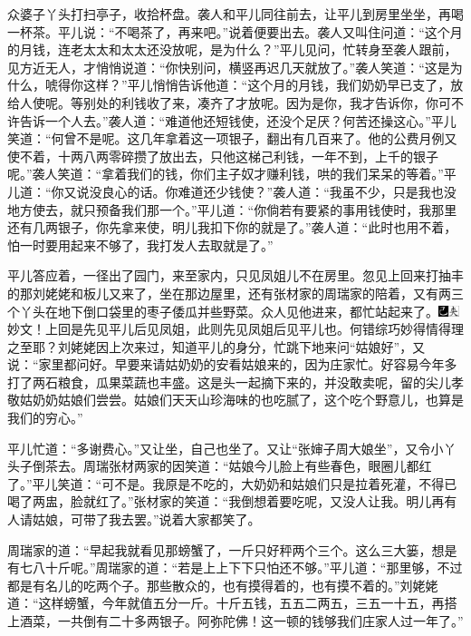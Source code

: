 众婆子丫头打扫亭子，收拾杯盘。袭人和平儿同往前去，让平儿到房里坐坐，再喝一杯茶。平儿说：``不喝茶了，再来吧。''说着便要出去。袭人又叫住问道：``这个月的月钱，连老太太和太太还没放呢，是为什么？''平儿见问，忙转身至袭人跟前，见方近无人，才悄悄说道：``你快别问，横竖再迟几天就放了。''袭人笑道：``这是为什么，唬得你这样？''平儿悄悄告诉他道：``这个月的月钱，我们奶奶早已支了，放给人使呢。等别处的利钱收了来，凑齐了才放呢。因为是你，我才告诉你，你可不许告诉一个人去。''袭人道：``难道他还短钱使，还没个足厌？何苦还操这心。''平儿笑道：``何曾不是呢。这几年拿着这一项银子，翻出有几百来了。他的公费月例又使不着，十两八两零碎攒了放出去，只他这梯己利钱，一年不到，上千的银子呢。''袭人笑道：``拿着我们的钱，你们主子奴才赚利钱，哄的我们呆呆的等着。''平儿道：``你又说没良心的话。你难道还少钱使？''袭人道：``我虽不少，只是我也没地方使去，就只预备我们那一个。''平儿道：``你倘若有要紧的事用钱使时，我那里还有几两银子，你先拿来使，明儿我扣下你的就是了。''袭人道：``此时也用不着，怕一时要用起来不够了，我打发人去取就是了。''

平儿答应着，一径出了园门，来至家内，只见凤姐儿不在房里。忽见上回来打抽丰的那刘姥姥和板儿又来了，坐在那边屋里，还有张材家的周瑞家的陪着，又有两三个丫头在地下倒口袋里的枣子倭瓜并些野菜。众人见他进来，都忙站起来了。{\includegraphics[width=3mm]{../Images/00003}\includegraphics[width=3mm]{../Images/00012}\footnotesize \kaishu 妙文！上回是先见平儿后见凤姐，此则先见凤姐后见平儿也。何错综巧妙得情得理之至耶？}刘姥姥因上次来过，知道平儿的身分，忙跳下地来问``姑娘好''，又说：``家里都问好。早要来请姑奶奶的安看姑娘来的，因为庄家忙。好容易今年多打了两石粮食，瓜果菜蔬也丰盛。这是头一起摘下来的，并没敢卖呢，留的尖儿孝敬姑奶奶姑娘们尝尝。姑娘们天天山珍海味的也吃腻了，这个吃个野意儿，也算是我们的穷心。''

平儿忙道：``多谢费心。''又让坐，自己也坐了。又让``张婶子周大娘坐''，又令小丫头子倒茶去。周瑞张材两家的因笑道：``姑娘今儿脸上有些春色，眼圈儿都红了。''平儿笑道：``可不是。我原是不吃的，大奶奶和姑娘们只是拉着死灌，不得已喝了两盅，脸就红了。''张材家的笑道：``我倒想着要吃呢，又没人让我。明儿再有人请姑娘，可带了我去罢。''说着大家都笑了。

周瑞家的道：``早起我就看见那螃蟹了，一斤只好秤两个三个。这么三大篓，想是有七八十斤呢。''周瑞家的道：``若是上上下下只怕还不够。''平儿道：``那里够，不过都是有名儿的吃两个子。那些散众的，也有摸得着的，也有摸不着的。''刘姥姥道：``这样螃蟹，今年就值五分一斤。十斤五钱，五五二两五，三五一十五，再搭上酒菜，一共倒有二十多两银子。阿弥陀佛！这一顿的钱够我们庄家人过一年了。''

